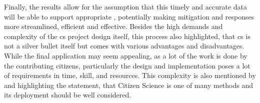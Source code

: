 Finally, the results allow for the assumption that this timely and accurate data will be able to support appropriate , potentially making mitigation and responses more streamlined, efficient and effective.\newline
Besides the high demands and complexity of the \acrshort{cs} project design itself, this process also highlighted, that \acrshort{cs} is not a silver bullet itself but comes with various advantages and disadvantages. While the final application may seem appealing, as a lot of the work is done by the contributing citizens, particularly the design and implementation poses a lot of requirements in time, skill, and resources. This complexity is also mentioned by \autocite{fraislCitizenScienceEnvironmental2022} and \autocite{minkmanCitizenScienceWater2015} highlighting the statement, that Citizen Science is one of many methods and its deployment should be well considered.


